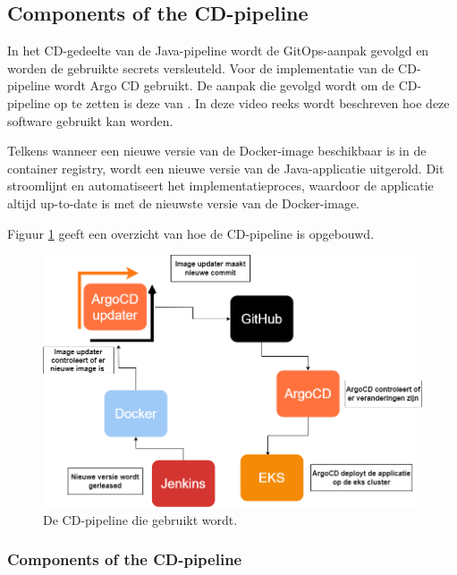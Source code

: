 \subsection{
{Components of the CD-pipeline}}
\label{sec:Bouwstenen van de CD-pipeline}

In het CD-gedeelte van de Java-pipeline wordt de GitOps-aanpak gevolgd en worden de gebruikte secrets versleuteld. Voor de implementatie van de CD-pipeline wordt Argo CD gebruikt. De aanpak die gevolgd wordt om de CD-pipeline op te zetten is deze van \textcite{Putra2023}. In deze video reeks wordt beschreven hoe deze software gebruikt kan worden.
\newline

Telkens wanneer een nieuwe versie van de Docker-image beschikbaar is in de container registry, wordt een nieuwe versie van de Java-applicatie uitgerold. Dit stroomlijnt en automatiseert het implementatieproces, waardoor de applicatie altijd up-to-date is met de nieuwste versie van de Docker-image.
\newline

Figuur \ref{fig:CDpipe} geeft een overzicht van hoe de CD-pipeline is opgebouwd.

\begin{figure}[H]
  \includegraphics[scale=0.35]{graphics/CDpipe.png}
\caption{\label{fig:CDpipe} De CD-pipeline die gebruikt wordt.}
\end{figure}

\subsubsection{
{Components of the CD-pipeline}}
\label{sec:Onderdelen van de CD-pipeline}

